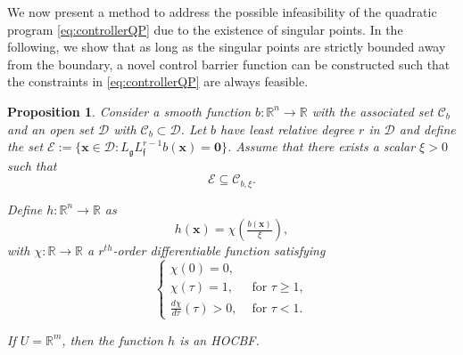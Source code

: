 \documentclass[letterpaper, 10 pt, journal, twoside]{IEEEtran}
\theoremstyle{plain}
\newtheorem{proposition}{Proposition}
\newcommand{\myvar}[1]{\bm{#1}}
\newcommand{\myset}[1]{\mathscr{#1}}
\begin{document}
We now present a method to address the possible infeasibility of  the quadratic program \eqref{eq:controllerQP} due to the existence of singular points. {In} the following, we show that as long as the singular points are strictly bounded away from the boundary, a novel control barrier function  can be constructed such that the constraints in \eqref{eq:controllerQP} are always feasible.

\begin{proposition} \label{prop:h_hocbf}
 Consider a smooth function $b:\mathbb{R}^n \to \mathbb{R}$ with the associated set $\myset{C}_b$ and an open set $\myset{D}$ with $\myset{C}_b \subset \myset{D}$. Let $b$ have least relative degree $r$ in $\myset{D}$ and define the set $\myset{E} := \{ \myvar{x} \in \myset{D}:  L_{\mathfrak{g}} L_{\mathfrak{f}}^{r-1} b(\myvar{x}) = \myvar{0} \}$. Assume that there exists a scalar $\xi > 0$ such that  
\begin{equation} \label{eq:bounded_away_from_safety_region}
    \myset{E} \subseteq \myset{C}_{b,\xi}.
\end{equation}

Define $h:\mathbb{R}^n \to \mathbb{R}$ as
\begin{equation} \label{eq:h_definition}
    h(\myvar{x}) = \chi\left(\tfrac{b(\myvar{x})}{\xi} \right),
\end{equation}
with $\chi: \mathbb{R} \to \mathbb{R}$ a $r^{th}$-order differentiable function satisfying 
\begin{equation} \label{eq:chi_property}
\left\{
\begin{array}{cc}
\chi(0) = 0, \\
\chi(\tau) = 1, & \text{ for } \tau \ge 1,  \\
 \tfrac{d\chi}{d\tau} (\tau)>0, &  \text{ for } \tau < 1.    
\end{array}\right.
\end{equation}

If $ U = \mathbb{R}^m$, then the function $h$ is an HOCBF.
\end{proposition}
\end{document}

